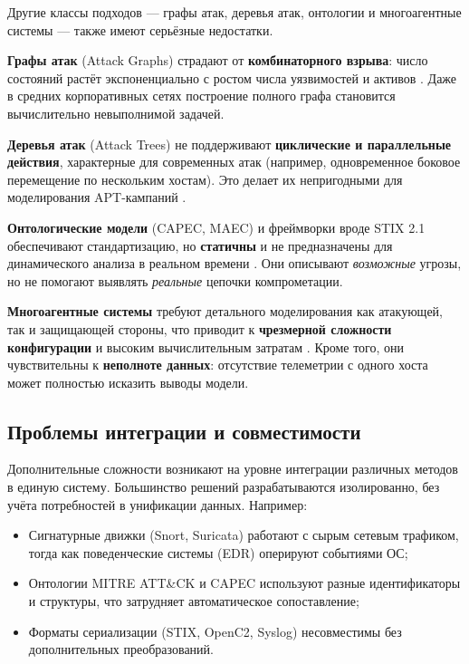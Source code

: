 Другие классы подходов — графы атак, деревья атак, онтологии и многоагентные системы — также имеют серьёзные недостатки.

\textbf{Графы атак} (Attack Graphs) страдают от \textbf{комбинаторного взрыва}: число состояний растёт экспоненциально с ростом числа уязвимостей и активов \cite{Sheyner2002}. Даже в средних корпоративных сетях построение полного графа становится вычислительно невыполнимой задачей.

\textbf{Деревья атак} (Attack Trees) не поддерживают \textbf{циклические и параллельные действия}, характерные для современных атак (например, одновременное боковое перемещение по нескольким хостам). Это делает их непригодными для моделирования APT-кампаний \cite{Lallie2019}.

\textbf{Онтологические модели} (CAPEC, MAEC) и фреймворки вроде STIX 2.1 обеспечивают стандартизацию, но \textbf{статичны} и не предназначены для динамического анализа в реальном времени \cite{Gorbachev2018}. Они описывают \textit{возможные} угрозы, но не помогают выявлять \textit{реальные} цепочки компрометации.

\textbf{Многоагентные системы} требуют детального моделирования как атакующей, так и защищающей стороны, что приводит к \textbf{чрезмерной сложности конфигурации} и высоким вычислительным затратам \cite{Zegzhda2016}. Кроме того, они чувствительны к \textbf{неполноте данных}: отсутствие телеметрии с одного хоста может полностью исказить выводы модели.

\subsection{Проблемы интеграции и совместимости}

Дополнительные сложности возникают на уровне интеграции различных методов в единую систему. Большинство решений разрабатываются изолированно, без учёта потребностей в унификации данных. Например:

\begin{itemize}
    \item Сигнатурные движки (Snort, Suricata) работают с сырым сетевым трафиком, тогда как поведенческие системы (EDR) оперируют событиями ОС;
    \item Онтологии MITRE ATT\&CK и CAPEC используют разные идентификаторы и структуры, что затрудняет автоматическое сопоставление;
    \item Форматы сериализации (STIX, OpenC2, Syslog) несовместимы без дополнительных преобразований.
\end{itemize}

